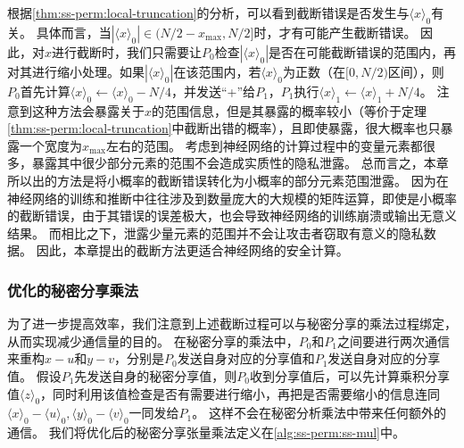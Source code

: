 根据\autoref{thm:ss-perm:local-truncation}的分析，可以看到截断错误是否发生与$\langle x \rangle_0$有关。
%
具体而言，当$|\langle x \rangle_0| \in (N/2-x_\text{max}, N/2]$时，才有可能产生截断错误。
%
因此，对$x$进行截断时，我们只需要让$P_0$检查$|\langle x \rangle_0|$是否在可能截断错误的范围内，再对其进行缩小处理。如果$|\langle x \rangle_0|$在该范围内，若$\langle x\rangle_0$为正数（在$[0, N/2)$区间），则$P_0$首先计算$\langle x \rangle_0 \gets \langle x \rangle_0 - N/4$，并发送“+”给$P_1$，$P_1$执行$\langle x \rangle_1 \gets \langle x \rangle_1 + N/4$。
%
注意到这种方法会暴露关于$x$的范围信息，但是其暴露的概率较小（等价于定理\autoref{thm:ss-perm:local-truncation}中截断出错的概率），且即使暴露，很大概率也只暴露一个宽度为$x_\text{max}$左右的范围。
%
考虑到神经网络的计算过程中的变量元素都很多，暴露其中很少部分元素的范围不会造成实质性的隐私泄露。
%
总而言之，本章所以出的方法是将小概率的截断错误转化为小概率的部分元素范围泄露。
因为在神经网络的训练和推断中往往涉及到数量庞大的大规模的矩阵运算，即使是小概率的截断错误，由于其错误的误差极大，也会导致神经网络的训练崩溃或输出无意义结果。
而相比之下，泄露少量元素的范围并不会让攻击者窃取有意义的隐私数据。
%
因此，本章提出的截断方法更适合神经网络的安全计算。

\subsubsection{优化的秘密分享乘法}
为了进一步提高效率，我们注意到上述截断过程可以与秘密分享的乘法过程绑定，从而实现减少通信量的目的。
%
在秘密分享的乘法中，$P_0$和$P_1$之间要进行两次通信来重构$x - u$和$y - v$，分别是$P_0$发送自身对应的分享值和$P_1$发送自身对应的分享值。
%
假设$P_1$先发送自身的秘密分享值，则$P_0$收到分享值后，可以先计算乘积分享值$\langle z \rangle_0$，同时利用该值检查是否有需要进行缩小，再把是否需要缩小的信息连同$\langle x \rangle_0 - \langle u \rangle_0, \langle y \rangle_0 - \langle v \rangle_0$一同发给$P_1$。
%
这样不会在秘密分析乘法中带来任何额外的通信。
%
我们将优化后的秘密分享张量乘法定义在\autoref{alg:ss-perm:ss-mul}中。


